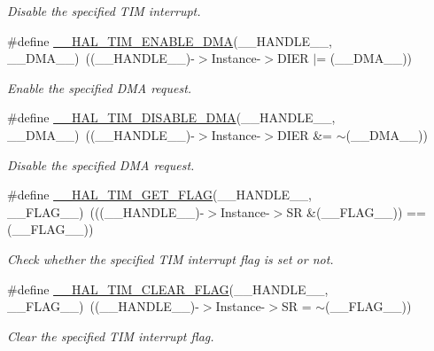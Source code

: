 \begin{DoxyCompactItemize}
\begin{DoxyCompactList}\small\item\em Disable the specified T\+IM interrupt. \end{DoxyCompactList}\item 
\#define \hyperlink{group___t_i_m___exported___macros_gabb91ccd46cd7204c87170a1ea5b38135}{\+\_\+\+\_\+\+H\+A\+L\+\_\+\+T\+I\+M\+\_\+\+E\+N\+A\+B\+L\+E\+\_\+\+D\+MA}(\+\_\+\+\_\+\+H\+A\+N\+D\+L\+E\+\_\+\+\_\+,  \+\_\+\+\_\+\+D\+M\+A\+\_\+\+\_\+)~((\+\_\+\+\_\+\+H\+A\+N\+D\+L\+E\+\_\+\+\_\+)-\/$>$Instance-\/$>$D\+I\+ER $\vert$= (\+\_\+\+\_\+\+D\+M\+A\+\_\+\+\_\+))
\begin{DoxyCompactList}\small\item\em Enable the specified D\+MA request. \end{DoxyCompactList}\item 
\#define \hyperlink{group___t_i_m___exported___macros_ga1a6e8b19efd23fd0295802d904c4702f}{\+\_\+\+\_\+\+H\+A\+L\+\_\+\+T\+I\+M\+\_\+\+D\+I\+S\+A\+B\+L\+E\+\_\+\+D\+MA}(\+\_\+\+\_\+\+H\+A\+N\+D\+L\+E\+\_\+\+\_\+,  \+\_\+\+\_\+\+D\+M\+A\+\_\+\+\_\+)~((\+\_\+\+\_\+\+H\+A\+N\+D\+L\+E\+\_\+\+\_\+)-\/$>$Instance-\/$>$D\+I\+ER \&= $\sim$(\+\_\+\+\_\+\+D\+M\+A\+\_\+\+\_\+))
\begin{DoxyCompactList}\small\item\em Disable the specified D\+MA request. \end{DoxyCompactList}\item 
\#define \hyperlink{group___t_i_m___exported___macros_ga96d98c66ad9d85f00c148de99888ef19}{\+\_\+\+\_\+\+H\+A\+L\+\_\+\+T\+I\+M\+\_\+\+G\+E\+T\+\_\+\+F\+L\+AG}(\+\_\+\+\_\+\+H\+A\+N\+D\+L\+E\+\_\+\+\_\+,  \+\_\+\+\_\+\+F\+L\+A\+G\+\_\+\+\_\+)~(((\+\_\+\+\_\+\+H\+A\+N\+D\+L\+E\+\_\+\+\_\+)-\/$>$Instance-\/$>$SR \&(\+\_\+\+\_\+\+F\+L\+A\+G\+\_\+\+\_\+)) == (\+\_\+\+\_\+\+F\+L\+A\+G\+\_\+\+\_\+))
\begin{DoxyCompactList}\small\item\em Check whether the specified T\+IM interrupt flag is set or not. \end{DoxyCompactList}\item 
\#define \hyperlink{group___t_i_m___exported___macros_ga2fe74db6b8cb4badd04ed48e0f5ac7b4}{\+\_\+\+\_\+\+H\+A\+L\+\_\+\+T\+I\+M\+\_\+\+C\+L\+E\+A\+R\+\_\+\+F\+L\+AG}(\+\_\+\+\_\+\+H\+A\+N\+D\+L\+E\+\_\+\+\_\+,  \+\_\+\+\_\+\+F\+L\+A\+G\+\_\+\+\_\+)~((\+\_\+\+\_\+\+H\+A\+N\+D\+L\+E\+\_\+\+\_\+)-\/$>$Instance-\/$>$SR = $\sim$(\+\_\+\+\_\+\+F\+L\+A\+G\+\_\+\+\_\+))
\begin{DoxyCompactList}\small\item\em Clear the specified T\+IM interrupt flag. \end{DoxyCompactList}\item 

\end{DoxyCompactItemize}
